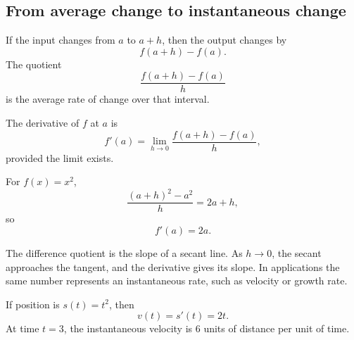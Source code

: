 \subsection{From average change to instantaneous change}

If the input changes from $a$ to $a+h$, then the output changes by
\[
f(a+h)-f(a).
\]
The quotient
\[
\frac{f(a+h)-f(a)}{h}
\]
is the average rate of change over that interval.

\begin{definitionbox}
The derivative of $f$ at $a$ is
\[
f'(a)=\lim_{h\to0}\frac{f(a+h)-f(a)}{h},
\]
provided the limit exists.
\end{definitionbox}

\begin{examplebox}
For $f(x)=x^2$,
\[
\frac{(a+h)^2-a^2}{h}=2a+h,
\]
so
\[
f'(a)=2a.
\]
\end{examplebox}

\begin{interpretationbox}
The difference quotient is the slope of a secant line. As $h\to0$, the secant approaches the tangent, and the derivative gives its slope. In applications the same number represents an instantaneous rate, such as velocity or growth rate.
\end{interpretationbox}

\begin{examplebox}[Velocity]
If position is $s(t)=t^2$, then
\[
v(t)=s'(t)=2t.
\]
At time $t=3$, the instantaneous velocity is $6$ units of distance per unit of time.
\end{examplebox}
